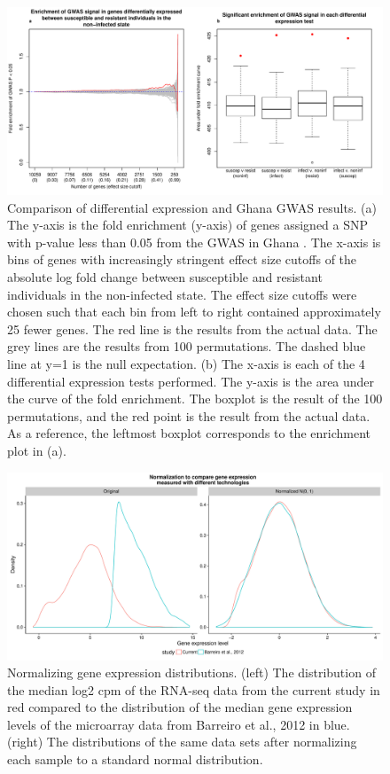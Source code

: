 \documentclass[fleqn,10pt]{wlscirep}
\begin{document}
\begin{figure}[ht]
\centering
\includegraphics[width=\linewidth]{../figure/gwas-supp.pdf}
\caption{
Comparison of differential expression and Ghana GWAS results. (a) The
y-axis is the fold enrichment (y-axis) of genes assigned a SNP with
p-value less than 0.05 from the GWAS in Ghana \cite{Thye2010}. The
x-axis is bins of genes with increasingly stringent effect size
cutoffs of the absolute log fold change between susceptible and
resistant individuals in the non-infected state. The effect size
cutoffs were chosen such that each bin from left to right contained
approximately 25 fewer genes. The red line is the results from the
actual data. The grey lines are the results from 100 permutations. The
dashed blue line at y=1 is the null expectation. (b)  The x-axis is
each of the 4 differential expression tests performed. The y-axis is
the area under the curve of the fold enrichment. The boxplot is the
result of the 100 permutations, and the red point is the result from
the actual data. As a reference, the leftmost boxplot corresponds to
the enrichment plot in (a).
}
\label{fig:gwas-supp}
\end{figure}

\begin{figure}[ht]
\centering
\includegraphics[width=\linewidth]{../figure/combined-distributions.pdf}
\caption{
Normalizing gene expression distributions. (left) The distribution of
the median log2 cpm of the RNA-seq data from the current study in red
compared to the distribution of the median gene expression levels of
the microarray data from Barreiro et al., 2012 \cite{Barreiro2012} in
blue. (right) The distributions of the same data sets after
normalizing each sample to a standard normal distribution.
}
\label{fig:combined-dist}
\end{figure}
\end{document}
